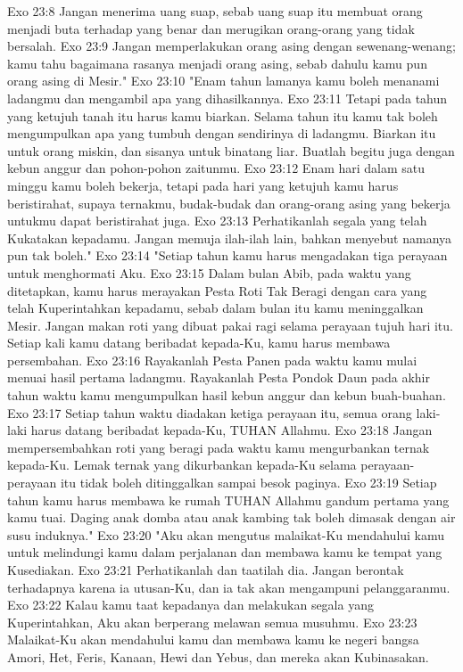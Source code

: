 Exo 23:8  Jangan menerima uang suap, sebab uang suap itu membuat orang menjadi buta terhadap yang benar dan merugikan orang-orang yang tidak bersalah.
Exo 23:9  Jangan memperlakukan orang asing dengan sewenang-wenang; kamu tahu bagaimana rasanya menjadi orang asing, sebab dahulu kamu pun orang asing di Mesir."
Exo 23:10  "Enam tahun lamanya kamu boleh menanami ladangmu dan mengambil apa yang dihasilkannya.
Exo 23:11  Tetapi pada tahun yang ketujuh tanah itu harus kamu biarkan. Selama tahun itu kamu tak boleh mengumpulkan apa yang tumbuh dengan sendirinya di ladangmu. Biarkan itu untuk orang miskin, dan sisanya untuk binatang liar. Buatlah begitu juga dengan kebun anggur dan pohon-pohon zaitunmu.
Exo 23:12  Enam hari dalam satu minggu kamu boleh bekerja, tetapi pada hari yang ketujuh kamu harus beristirahat, supaya ternakmu, budak-budak dan orang-orang asing yang bekerja untukmu dapat beristirahat juga.
Exo 23:13  Perhatikanlah segala yang telah Kukatakan kepadamu. Jangan memuja ilah-ilah lain, bahkan menyebut namanya pun tak boleh."
Exo 23:14  "Setiap tahun kamu harus mengadakan tiga perayaan untuk menghormati Aku.
Exo 23:15  Dalam bulan Abib, pada waktu yang ditetapkan, kamu harus merayakan Pesta Roti Tak Beragi dengan cara yang telah Kuperintahkan kepadamu, sebab dalam bulan itu kamu meninggalkan Mesir. Jangan makan roti yang dibuat pakai ragi selama perayaan tujuh hari itu. Setiap kali kamu datang beribadat kepada-Ku, kamu harus membawa persembahan.
Exo 23:16  Rayakanlah Pesta Panen pada waktu kamu mulai menuai hasil pertama ladangmu. Rayakanlah Pesta Pondok Daun pada akhir tahun waktu kamu mengumpulkan hasil kebun anggur dan kebun buah-buahan.
Exo 23:17  Setiap tahun waktu diadakan ketiga perayaan itu, semua orang laki-laki harus datang beribadat kepada-Ku, TUHAN Allahmu.
Exo 23:18  Jangan mempersembahkan roti yang beragi pada waktu kamu mengurbankan ternak kepada-Ku. Lemak ternak yang dikurbankan kepada-Ku selama perayaan-perayaan itu tidak boleh ditinggalkan sampai besok paginya.
Exo 23:19  Setiap tahun kamu harus membawa ke rumah TUHAN Allahmu gandum pertama yang kamu tuai. Daging anak domba atau anak kambing tak boleh dimasak dengan air susu induknya."
Exo 23:20  "Aku akan mengutus malaikat-Ku mendahului kamu untuk melindungi kamu dalam perjalanan dan membawa kamu ke tempat yang Kusediakan.
Exo 23:21  Perhatikanlah dan taatilah dia. Jangan berontak terhadapnya karena ia utusan-Ku, dan ia tak akan mengampuni pelanggaranmu.
Exo 23:22  Kalau kamu taat kepadanya dan melakukan segala yang Kuperintahkan, Aku akan berperang melawan semua musuhmu.
Exo 23:23  Malaikat-Ku akan mendahului kamu dan membawa kamu ke negeri bangsa Amori, Het, Feris, Kanaan, Hewi dan Yebus, dan mereka akan Kubinasakan.

